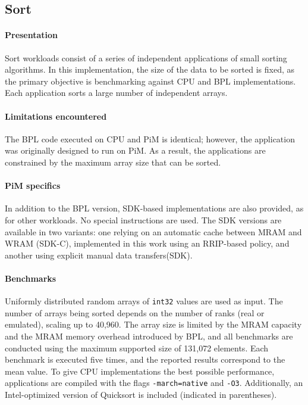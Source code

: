 \subsection{Sort}
\label{sec:sort}

\paragraph{Presentation}
Sort workloads consist of a series of independent applications of small sorting algorithms.
In this implementation, the size of the data to be sorted is fixed, as the primary objective is benchmarking against CPU and BPL implementations.
Each application sorts a large number of independent arrays.

\paragraph{Limitations encountered}
The BPL code executed on CPU and PiM is identical; however, the application was originally designed to run on PiM.
As a result, the applications are constrained by the maximum array size that can be sorted.

\paragraph{PiM specifics}
In addition to the BPL version, SDK-based implementations are also provided, as for other workloads.
No special instructions are used.
The SDK versions are available in two variants: one relying on an automatic cache between MRAM and WRAM (SDK-C), implemented in this work using an RRIP-based policy, and another using explicit manual data transfers(SDK).

\paragraph{Benchmarks}
Uniformly distributed random arrays of \texttt{int32} values are used as input.
The number of arrays being sorted depends on the number of ranks (real or emulated), scaling up to 40{,}960.
The array size is limited by the MRAM capacity and the MRAM memory overhead introduced by BPL, and all benchmarks are conducted using the maximum supported size of 131{,}072 elements.
Each benchmark is executed five times, and the reported results correspond to the mean value.
To give CPU implementations the best possible performance, applications are compiled with the flags \texttt{-march=native} and \texttt{-O3}.
Additionally, an Intel-optimized version of Quicksort is included (indicated in parentheses).



